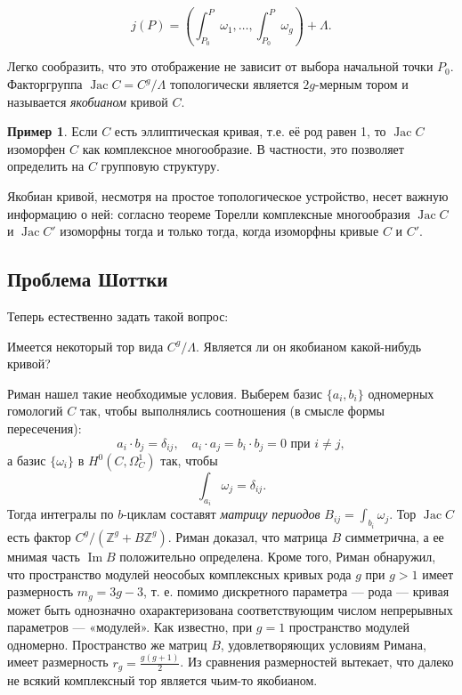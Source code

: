 \documentclass{article}
\theoremstyle{definition}
\theoremstyle{definition} %
\theoremstyle{remark}     %
\theoremstyle{definition}
\theoremstyle{definition}
\theoremstyle{definition}
\theoremstyle{definition}
\theoremstyle{definition}
\theoremstyle{definition}
\newtheorem*{example}{Пример}
\theoremstyle{definition}
\theoremstyle{definition}
\begin{document}
\[
j(P) = \left( \int_{P_0}^{P} \omega_1, \ldots, \int_{P_0}^{P} \omega_g \right) + \Lambda.
\]

Легко сообразить, что это отображение не зависит от выбора начальной точки \( P_0 \). Факторгруппа \( \operatorname{Jac} C = C^g / \Lambda \) топологически является \( 2g \)-мерным тором и называется \textit{якобианом} кривой \( C \).

\begin{example} Если \( C \) есть эллиптическая кривая, т.е. её род равен 1, то \( \operatorname{Jac} C\) изоморфен \( C \) как комплексное многообразие. В частности, это позволяет определить на \( C \) групповую структуру.
\end{example}

Якобиан кривой, несмотря на простое топологическое устройство, несет важную информацию о ней: согласно теореме Торелли комплексные многообразия \( \operatorname{Jac} C \) и \( \operatorname{Jac} C' \) изоморфны тогда и только тогда, когда изоморфны кривые \( C \) и \( C' \).





\subsection{Проблема Шоттки}

Теперь естественно задать такой вопрос:

Имеется некоторый тор вида \( C^g / \Lambda \). Является ли он якобианом какой-нибудь кривой?

Риман нашел такие необходимые условия. Выберем базис \(\{a_i, b_i\}\) одномерных гомологий \(C\) так, чтобы выполнялись соотношения (в смысле формы пересечения):
\[
a_i \cdot b_j = \delta_{ij}, \quad a_i \cdot a_j = b_i \cdot b_j = 0 \text{ при } i \neq j,
\]
а базис \(\{\omega_i\}\) в \(H^0(C, \Omega_C^1)\) так, чтобы
\[
\int_{a_i} \omega_j = \delta_{ij}.
\]
Тогда интегралы по \(b\)-циклам составят \emph{матрицу периодов} \(B_{ij} = \int_{b_i} \omega_j\). Тор \(\operatorname{Jac} C\) есть фактор \(C^g / (\mathbb{Z}^g + B\mathbb{Z}^g)\). Риман доказал, что матрица \(B\) симметрична, а ее мнимая часть \(\operatorname{Im} B\) положительно определена. Кроме того, Риман обнаружил, что пространство модулей неособых комплексных кривых рода \(g\) при \(g > 1\) имеет размерность \(m_g = 3g - 3\), т. е. помимо дискретного параметра --- рода --- кривая может быть однозначно охарактеризована соответствующим числом непрерывных параметров --- «модулей». Как известно, при \(g = 1\) пространство модулей одномерно. Пространство же матриц \(B\), удовлетворяющих условиям Римана, имеет размерность \(r_g = \frac{g(g+1)}{2}\). Из сравнения размерностей вытекает, что далеко не всякий комплексный тор является чьим-то якобианом.
\end{document}
